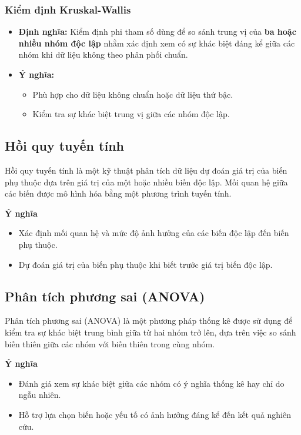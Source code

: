 \subsubsection{Kiểm định Kruskal-Wallis}  
\begin{itemize}
    \item \textbf{Định nghĩa:} Kiểm định phi tham số dùng để so sánh trung vị của \textbf{ba hoặc nhiều nhóm độc lập} nhằm xác định xem có sự khác biệt đáng kể giữa các nhóm khi dữ liệu không theo phân phối chuẩn.  
    \item \textbf{Ý nghĩa:}  
    \begin{itemize}
        \item Phù hợp cho dữ liệu không chuẩn hoặc dữ liệu thứ bậc.  
        \item Kiểm tra sự khác biệt trung vị giữa các nhóm độc lập.  
    \end{itemize}
\end{itemize}

\subsection{Hồi quy tuyến tính}
Hồi quy tuyến tính là một kỹ thuật phân tích dữ liệu dự đoán giá trị của biến phụ thuộc dựa trên giá trị của một hoặc nhiều biến độc lập. Mối quan hệ giữa các biến được mô hình hóa bằng một phương trình tuyến tính.

\textbf{Ý nghĩa}
\begin{itemize}
    \item Xác định mối quan hệ và mức độ ảnh hưởng của các biến độc lập đến biến phụ thuộc.
    \item Dự đoán giá trị của biến phụ thuộc khi biết trước giá trị biến độc lập.
\end{itemize}

\subsection{Phân tích phương sai (ANOVA)}
Phân tích phương sai (ANOVA) là một phương pháp thống kê được sử dụng để kiểm tra sự khác biệt trung bình giữa từ hai nhóm trở lên, dựa trên việc so sánh biến thiên giữa các nhóm với biến thiên trong cùng nhóm.

\textbf{Ý nghĩa}
\begin{itemize}
    \item Đánh giá xem sự khác biệt giữa các nhóm có ý nghĩa thống kê hay chỉ do ngẫu nhiên.
    \item Hỗ trợ lựa chọn biến hoặc yếu tố có ảnh hưởng đáng kể đến kết quả nghiên cứu.
\end{itemize}
